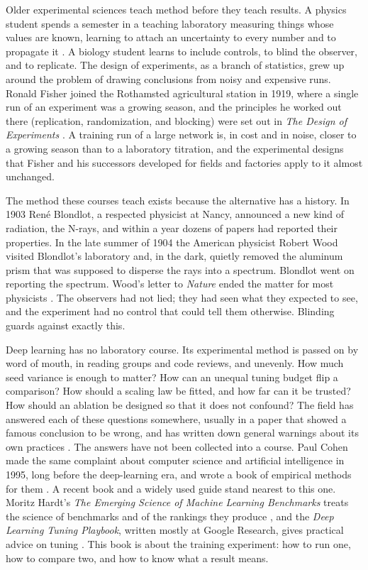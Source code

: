\begin{refsection}
Older experimental sciences teach method before they teach results. A physics student spends a semester in a teaching laboratory measuring things whose values are known, learning to attach an uncertainty to every number and to propagate it \parencite{Taylor1997}. A biology student learns to include controls, to blind the observer, and to replicate. The design of experiments, as a branch of statistics, grew up around the problem of drawing conclusions from noisy and expensive runs. Ronald Fisher joined the Rothamsted agricultural station in 1919, where a single run of an experiment was a growing season, and the principles he worked out there (replication, randomization, and blocking) were set out in \emph{The Design of Experiments} \parencite{Fisher1935}. A training run of a large network is, in cost and in noise, closer to a growing season than to a laboratory titration, and the experimental designs that Fisher and his successors developed for fields and factories \parencite{BoxHunterHunter2005} apply to it almost unchanged.

The method these courses teach exists because the alternative has a history. In 1903 Ren\'e Blondlot, a respected physicist at Nancy, announced a new kind of radiation, the N-rays, and within a year dozens of papers had reported their properties. In the late summer of 1904 the American physicist Robert Wood visited Blondlot's laboratory and, in the dark, quietly removed the aluminum prism that was supposed to disperse the rays into a spectrum. Blondlot went on reporting the spectrum. Wood's letter to \emph{Nature} ended the matter for most physicists \parencite{Wood1904}. The observers had not lied; they had seen what they expected to see, and the experiment had no control that could tell them otherwise. Blinding guards against exactly this.

Deep learning has no laboratory course. Its experimental method is passed on by word of mouth, in reading groups and code reviews, and unevenly. How much seed variance is enough to matter? How can an unequal tuning budget flip a comparison? How should a scaling law be fitted, and how far can it be trusted? How should an ablation be designed so that it does not confound? The field has answered each of these questions somewhere, usually in a paper that showed a famous conclusion to be wrong, and has written down general warnings about its own practices \parencite{SculleyEtAl2018,LiptonSteinhardt2019}. The answers have not been collected into a course. Paul Cohen made the same complaint about computer science and artificial intelligence in 1995, long before the deep-learning era, and wrote a book of empirical methods for them \parencite{Cohen1995}. A recent book and a widely used guide stand nearest to this one. Moritz Hardt's \emph{The Emerging Science of Machine Learning Benchmarks} treats the science of benchmarks and of the rankings they produce \parencite{Hardt2026}, and the \emph{Deep Learning Tuning Playbook}, written mostly at Google Research, gives practical advice on tuning \parencite{GodboleEtAl2023}. This book is about the training experiment: how to run one, how to compare two, and how to know what a result means.


\end{refsection}
